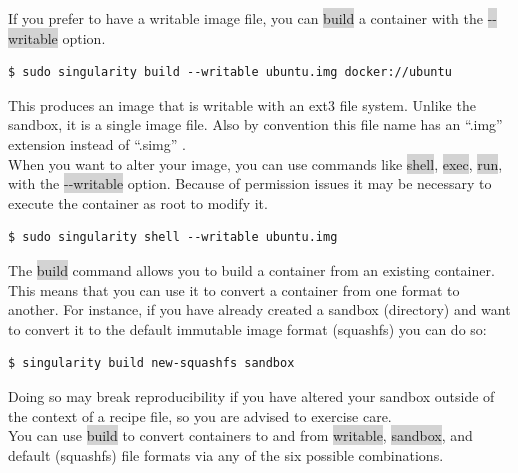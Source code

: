 \documentclass[a4paper]{article}
\newcounter{subsubsubsection}[subsubsection]
\begin{document}

If you prefer to have a writable image file, you can \colorbox{lightgray}{build} a container with the \colorbox{lightgray}{-{}-writable} option.\\

\begin{lstlisting}[frame=single]
$ sudo singularity build --writable ubuntu.img docker://ubuntu
\end{lstlisting}

This produces an image that is writable with an ext3 file system. Unlike the sandbox, it is a single image file. Also by convention this file name has an “.img” extension instead of “.simg” .\\

When you want to alter your image, you can use commands like \colorbox{lightgray}{shell}, \colorbox{lightgray}{exec}, \colorbox{lightgray}{run}, with the \colorbox{lightgray}{-{}-writable} option. Because of permission issues it may be necessary to execute the container as root to modify it.

\begin{lstlisting}[frame=single]
$ sudo singularity shell --writable ubuntu.img
\end{lstlisting}


The \colorbox{lightgray}{build} command allows you to build a container from an existing container. This means that you can use it to convert a container from one format to another. For instance, if you have already created a sandbox (directory) and want to convert it to the default immutable image format (squashfs) you can do so:\\

\begin{lstlisting}[frame=single]
$ singularity build new-squashfs sandbox
\end{lstlisting}

Doing so may break reproducibility if you have altered your sandbox outside of the context of a recipe file, so you are advised to exercise care.\\

You can use \colorbox{lightgray}{build} to convert containers to and from \colorbox{lightgray}{writable}, \colorbox{lightgray}{sandbox}, and default (squashfs) file formats via any of the six possible combinations.

\end{document}
